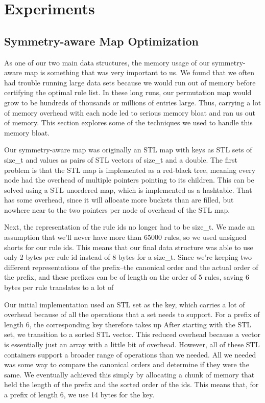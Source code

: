 \documentclass[]{report}
\theoremstyle{definition}
\begin{document}
\chapter{Experiments}

\section{Symmetry-aware Map Optimization}
As one of our two main data structures, the memory usage of our symmetry-aware map is something that was very important to us.
We found that we often had trouble running large data sets because we would run out of memory before certifying the optimal rule list.
In these long runs, our permutation map would grow to be hundreds of thousands or millions of entries large.
Thus, carrying a lot of memory overhead with each node led to serious memory bloat and ran us out of memory.
This section explores some of the techniques we used to handle this memory bloat.

Our symmetry-aware map was originally an STL map with keys as STL sets of size\_t and values as pairs of STL vectors of size\_t and a double.
The first problem is that the STL map is implemented as a red-black tree, meaning every node had the overhead of multiple pointers pointing to its children.
This can be solved using a STL unordered map, which is implemented as a hashtable.
That has some overhead, since it will allocate more buckets than are filled, but nowhere near to the two pointers per node of overhead of the STL map.

Next, the representation of the rule ids no longer had to be size\_t.
We made an assumption that we'll never have more than 65000 rules, so we used unsigned shorts for our rule ids.
This means that our final data structure was able to use only 2 bytes per rule id instead of 8 bytes for a size\_t.
Since we're keeping two different representations of the prefix--the canonical order and the actual order of the prefix, and these prefixes can be of length on the order of 5 rules, saving 6 bytes per rule translates to a lot of 

Our initial implementation used an STL set as the key, which carries a lot of overhead because of all the operations that a set needs to support.
For a prefix of length 6, the corresponding key therefore takes up 
After starting with the STL set, we transition to a sorted STL vector.
This reduced overhead because a vector is essentially just an array with a little bit of overhead.
However, all of these STL containers support a broader range of operations than we needed.
All we needed was some way to compare the canonical orders and determine if they were the same.
We eventually achieved this simply by allocating a chunk of memory that held the length of the prefix and the sorted order of the ids.
This means that, for a prefix of length 6, we use 14 bytes for the key.
\end{document}

